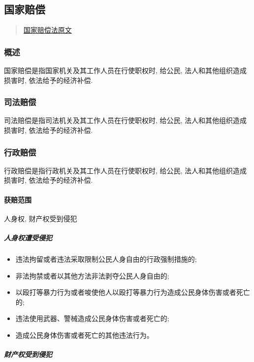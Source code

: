 \subsection{国家赔偿}

\begin{quote}
    \href{https://www.gjxfj.gov.cn/gjxfj/xxgk/fgwj/flfg/webinfo/2016/03/1460585589927542.htm}{国家赔偿法原文}
\end{quote}

\subsubsection{概述}

国家赔偿是指国家机关及其工作人员在行使职权时, 给公民, 法人和其他组织造成损害时, 依法给予的经济补偿.

\subsubsection{司法赔偿}

司法赔偿是指司法机关及其工作人员在行使职权时, 给公民, 法人和其他组织造成损害时, 依法给予的经济补偿.

\subsubsection{行政赔偿}

行政赔偿是指行政机关及其工作人员在行使职权时, 给公民, 法人和其他组织造成损害时, 依法给予的经济补偿.

\paragraph{获赔范围} 人身权, 财产权受到侵犯

\subparagraph{人身权遭受侵犯}

\begin{itemize}
    \item 违法拘留或者违法采取限制公民人身自由的行政强制措施的;
    \item 非法拘禁或者以其他方法非法剥夺公民人身自由的;
    \item 以殴打等暴力行为或者唆使他人以殴打等暴力行为造成公民身体伤害或者死亡的;
    \item 违法使用武器、警械造成公民身体伤害或者死亡的;
    \item 造成公民身体伤害或者死亡的其他违法行为。
\end{itemize}

\subparagraph{财产权受到侵犯}

